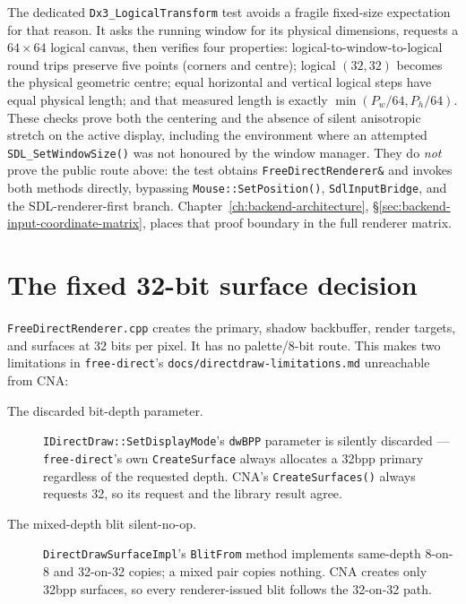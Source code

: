 The dedicated \texttt{Dx3\_LogicalTransform} test avoids a fragile fixed-size expectation for
that reason. It asks the running window for its physical dimensions, requests a $64\times64$
logical canvas, then verifies four properties: logical-to-window-to-logical round trips preserve
five points (corners and centre); logical $(32,32)$ becomes the physical geometric centre;
equal horizontal and vertical logical steps have equal physical length; and that measured length
is exactly $\min(P_w/64,P_h/64)$. These checks prove both the centering and the absence of
silent anisotropic stretch on the active display, including the
environment where an attempted \texttt{SDL\_SetWindowSize()} was not honoured by the window
manager. They do \emph{not} prove the public route above: the test obtains
\texttt{FreeDirectRenderer\&} and invokes both methods directly, bypassing
\texttt{Mouse::SetPosition()}, \texttt{SdlInputBridge}, and the SDL-renderer-first branch.
Chapter~\ref{ch:backend-architecture},
\S\ref{sec:backend-input-coordinate-matrix}, places that proof boundary in the full renderer
matrix.

\section{The fixed 32-bit surface decision}

\texttt{FreeDirectRenderer.cpp} creates the primary, shadow backbuffer, render targets, and
 surfaces at 32 bits per pixel. It has no palette/8-bit route. This makes two
limitations in \texttt{free-direct}'s \texttt{docs/directdraw-limitations.md} unreachable from
CNA:

\begin{description}
  \item[The discarded bit-depth parameter.] \texttt{IDirectDraw::SetDisplayMode}'s
        \texttt{dwBPP} parameter is silently discarded --- \texttt{free-direct}'s own
        \texttt{CreateSurface} always allocates a
        32bpp primary regardless of the requested depth. CNA's \texttt{CreateSurfaces()} always
        requests 32, so its request and the library result agree.
  \item[The mixed-depth blit silent-no-op.] \texttt{DirectDrawSurfaceImpl}'s \texttt{BlitFrom}
        method implements same-depth 8-on-8 and 32-on-32 copies; a mixed pair copies nothing.
        CNA creates only 32bpp surfaces, so every renderer-issued blit follows the 32-on-32 path.
\end{description}

